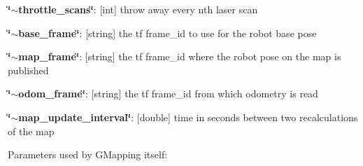 \begin{DoxyItemize}
\item {\bfseries \char`\"{}$\sim$throttle\+\_\+scans\char`\"{}}\+: {\bfseries }\mbox{[}int\mbox{]} throw away every nth laser scan
\item {\bfseries \char`\"{}$\sim$base\+\_\+frame\char`\"{}}\+: {\bfseries }\mbox{[}string\mbox{]} the tf frame\+\_\+id to use for the robot base pose
\item {\bfseries \char`\"{}$\sim$map\+\_\+frame\char`\"{}}\+: {\bfseries }\mbox{[}string\mbox{]} the tf frame\+\_\+id where the robot pose on the map is published
\item {\bfseries \char`\"{}$\sim$odom\+\_\+frame\char`\"{}}\+: {\bfseries }\mbox{[}string\mbox{]} the tf frame\+\_\+id from which odometry is read
\item {\bfseries \char`\"{}$\sim$map\+\_\+update\+\_\+interval\char`\"{}}\+: {\bfseries }\mbox{[}double\mbox{]} time in seconds between two recalculations of the map
\end{DoxyItemize}

Parameters used by G\+Mapping itself\+:

